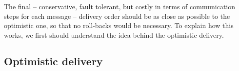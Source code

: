 \documentclass[times, 10pt]{article}
\begin{document}
The final -- conservative, fault tolerant, but costly in terms of communication steps for each message -- delivery order should be as close as possible to the optimistic one, so that no roll-backs would be necessary. To explain how this works, we first should understand the idea behind the optimistic delivery.

\subsection{Optimistic delivery}



\end{document}
